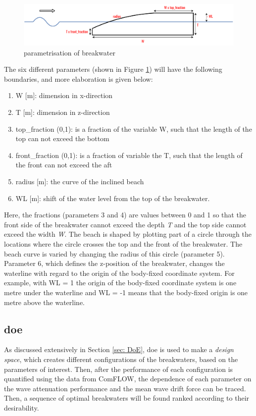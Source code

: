 \begin{figure}[h]
    \centering
    \includegraphics[width = \linewidth]{figures/Methodology/parametrisation.pdf}
    \caption{parametrisation of breakwater}
    \label{fig: parametrisation breakwater}
\end{figure}

The six different parameters (shown in Figure \ref{fig: parametrisation breakwater}) will have the following boundaries, and more elaboration is given below:
\begin{enumerate}
    \item W [m]: dimension in x-direction
    \item T [m]: dimension in z-direction
    \item top\_fraction (0,1): is a fraction of the variable W, such that the length of the top can not exceed the bottom 
    \item front\_fraction (0,1): is a fraction of variable the T, such that the length of the front can not exceed the aft 
    \item radius [m]: the curve of the inclined beach
    \item WL [m]: shift of the water level from the top of the breakwater. 
\end{enumerate}

Here, the fractions (parameters 3 and 4) are values between 0 and 1 so that the front side of the breakwater cannot exceed the depth \textit{T} and the top side cannot exceed the width \textit{W}. The beach is shaped by plotting part of a circle through the locations where the circle crosses the top and the front of the breakwater. The beach curve is varied by changing the radius of this circle (parameter 5). Parameter 6, which defines the z-position of the breakwater, changes the waterline with regard to the origin of the body-fixed coordinate system. For example, with WL = 1 the origin of the body-fixed coordinate system is one metre under the waterline and WL = -1 means that the body-fixed origin is one metre above the waterline.



\subsection{\acrfull{doe}}
\label{subsec: methodology doe}
As discussed extensively in Section \ref{sec: DoE}, \acrshort{doe} is used to make a \textit{design space}, which creates different configurations of the breakwaters, based on the parameters of interest. Then, after the performance of each configuration is quantified using the data from ComFLOW, the dependence of each parameter on the wave attenuation performance and the mean wave drift force can be traced. Then, a sequence of optimal breakwaters will be found ranked according to their desirability.



